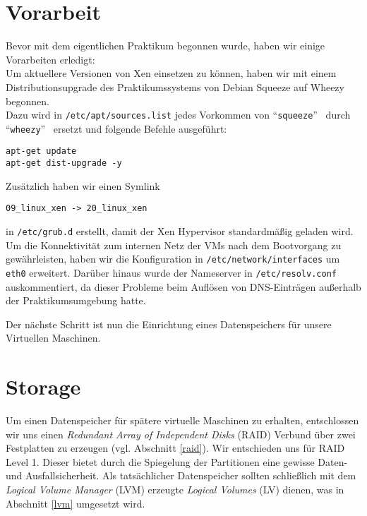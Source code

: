 \chapter{Vorarbeit}
\label{chap:whezzy_ugprade}
Bevor mit dem eigentlichen Praktikum begonnen wurde, haben wir einige Vorarbeiten erledigt: \\ 
Um aktuellere Versionen von Xen einsetzen zu können, haben wir mit einem Distributionsupgrade des Praktikumssystems von Debian Squeeze auf Wheezy begonnen. \\ 
Dazu wird in \verb#/etc/apt/sources.list# jedes Vorkommen von \textquotedblleft\verb#squeeze#\textquotedblright ~ durch \textquotedblleft\verb#wheezy#\textquotedblright ~ ersetzt und folgende Befehle ausgeführt: 

\begin{verbatim}
apt-get update
apt-get dist-upgrade -y
\end{verbatim}
Zusätzlich haben wir einen Symlink 
\setupVerbatimOut 
\begin{verbatim} 
09_linux_xen -> 20_linux_xen 
\end{verbatim} 
in \verb#/etc/grub.d# erstellt, damit der Xen Hypervisor standardmäßig geladen wird.
\\
Um die Konnektivität zum internen Netz der VMs nach dem Bootvorgang zu gewährleisten, haben wir die Konfiguration in \verb#/etc/network/interfaces# um \verb#eth0# erweitert. Darüber hinaus wurde der Nameserver in \verb#/etc/resolv.conf# auskommentiert, da dieser Probleme beim Auflösen von DNS-Einträgen außerhalb der Praktikumsumgebung hatte.

Der nächste Schritt ist nun die Einrichtung eines Datenspeichers für unsere Virtuellen Maschinen.

\chapter{Storage}\label{chap:stor}
Um einen Datenspeicher für spätere virtuelle Maschinen zu erhalten, entschlossen wir uns einen \emph{Redundant Array of Independent Disks} (RAID) Verbund über zwei Festplatten zu erzeugen (vgl. Abschnitt \ref{raid}). Wir entschieden uns für RAID Level 1. Dieser bietet durch die Spiegelung der Partitionen eine gewisse Daten- und Ausfallsicherheit. Als tatsächlicher Datenspeicher sollten schließlich mit dem \emph{Logical Volume Manager} (LVM) erzeugte \emph{Logical Volumes} (LV) dienen, was in Abschnitt \ref{lvm} umgesetzt wird.
